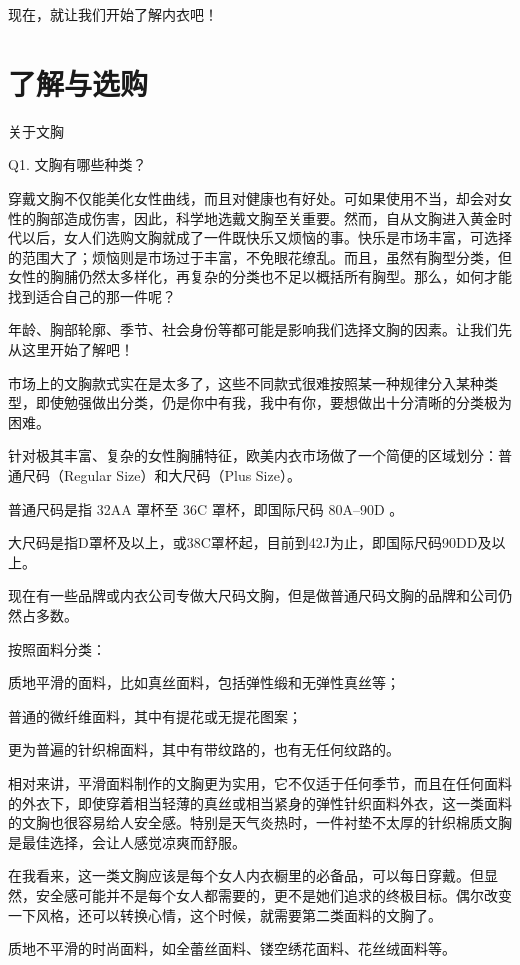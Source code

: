 \documentclass[12pt,UTF8]{ctexbook}
\begin{document}
现在，就让我们开始了解内衣吧！

\chapter{了解与选购}

关于文胸

Q1. 文胸有哪些种类？

穿戴文胸不仅能美化女性曲线，而且对健康也有好处。可如果使用不当，却会对女性的胸部造成伤害，因此，科学地选戴文胸至关重要。然而，自从文胸进入黄金时代以后，女人们选购文胸就成了一件既快乐又烦恼的事。快乐是市场丰富，可选择的范围大了；烦恼则是市场过于丰富，不免眼花缭乱。而且，虽然有胸型分类，但女性的胸脯仍然太多样化，再复杂的分类也不足以概括所有胸型。那么，如何才能找到适合自己的那一件呢？

年龄、胸部轮廓、季节、社会身份等都可能是影响我们选择文胸的因素。让我们先从这里开始了解吧！

市场上的文胸款式实在是太多了，这些不同款式很难按照某一种规律分入某种类型，即使勉强做出分类，仍是你中有我，我中有你，要想做出十分清晰的分类极为困难。

针对极其丰富、复杂的女性胸脯特征，欧美内衣市场做了一个简便的区域划分：普通尺码（Regular Size）和大尺码（Plus Size）。

普通尺码是指 32AA 罩杯至 36C 罩杯，即国际尺码 80A--90D 。

大尺码是指D罩杯及以上，或38C罩杯起，目前到42J为止，即国际尺码90DD及以上。

现在有一些品牌或内衣公司专做大尺码文胸，但是做普通尺码文胸的品牌和公司仍然占多数。

按照面料分类：

质地平滑的面料，比如真丝面料，包括弹性缎和无弹性真丝等；

普通的微纤维面料，其中有提花或无提花图案；

更为普遍的针织棉面料，其中有带纹路的，也有无任何纹路的。

相对来讲，平滑面料制作的文胸更为实用，它不仅适于任何季节，而且在任何面料的外衣下，即使穿着相当轻薄的真丝或相当紧身的弹性针织面料外衣，这一类面料的文胸也很容易给人安全感。特别是天气炎热时，一件衬垫不太厚的针织棉质文胸是最佳选择，会让人感觉凉爽而舒服。

在我看来，这一类文胸应该是每个女人内衣橱里的必备品，可以每日穿戴。但显然，安全感可能并不是每个女人都需要的，更不是她们追求的终极目标。偶尔改变一下风格，还可以转换心情，这个时候，就需要第二类面料的文胸了。

质地不平滑的时尚面料，如全蕾丝面料、镂空绣花面料、花丝绒面料等。
\end{document}
